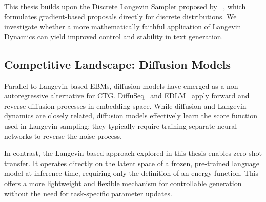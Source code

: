 \documentclass[11pt]{article}
\begin{document}
This thesis builds upon the Discrete Langevin Sampler proposed by ~\cite{zhang2022langevinlikesamplerdiscretedistributions}, which formulates gradient-based proposals directly for discrete distributions. We investigate whether a more mathematically faithful application of Langevin Dynamics can yield improved control and stability in text generation.

\subsection{Competitive Landscape: Diffusion Models}

Parallel to Langevin-based EBMs, diffusion models have emerged as a non-autoregressive alternative for CTG. DiffuSeq~\cite{gong2023diffuseqsequencesequencetext} and EDLM~\cite{ICLR2025_535baca3} apply forward and reverse diffusion processes in embedding space. While diffusion and Langevin dynamics are closely related, diffusion models effectively learn the score function used in Langevin sampling; they typically require training separate neural networks to reverse the noise process.

In contrast, the Langevin-based approach explored in this thesis enables zero-shot transfer. It operates directly on the latent space of a frozen, pre-trained language model at inference time, requiring only the definition of an energy function. This offers a more lightweight and flexible mechanism for controllable generation without the need for task-specific parameter updates.



\end{document}
